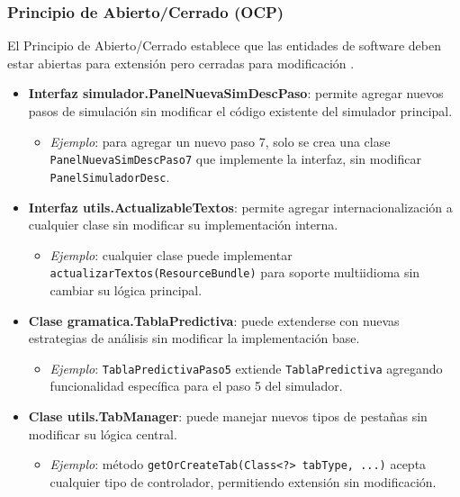 \subsubsection{Principio de Abierto/Cerrado (OCP)}

El Principio de Abierto/Cerrado establece que las entidades de software deben estar abiertas para extensión pero cerradas para modificación \cite{meyer1988object, martin2003agile}.

\begin{itemize}
    \item \textbf{Interfaz simulador.PanelNuevaSimDescPaso}: permite agregar nuevos pasos de simulación sin modificar el código existente del simulador principal.
    \begin{itemize}
        \item \textit{Ejemplo}: para agregar un nuevo paso 7, solo se crea una clase \texttt{PanelNuevaSimDescPaso7} que implemente la interfaz, sin modificar \texttt{PanelSimuladorDesc}.
    \end{itemize}

    \item \textbf{Interfaz utils.ActualizableTextos}: permite agregar internacionalización a cualquier clase sin modificar su implementación interna.
    \begin{itemize}
        \item \textit{Ejemplo}: cualquier clase puede implementar \texttt{actualizarTextos(ResourceBundle)} para soporte multiidioma sin cambiar su lógica principal.
    \end{itemize}

    \item \textbf{Clase gramatica.TablaPredictiva}: puede extenderse con nuevas estrategias de análisis sin modificar la implementación base.
    \begin{itemize}
        \item \textit{Ejemplo}: \texttt{TablaPredictivaPaso5} extiende \texttt{TablaPredictiva} agregando funcionalidad específica para el paso 5 del simulador.
    \end{itemize}

    \item \textbf{Clase utils.TabManager}: puede manejar nuevos tipos de pestañas sin modificar su lógica central.
    \begin{itemize}
        \item \textit{Ejemplo}: método \texttt{getOrCreateTab(Class<?> tabType, ...)} acepta cualquier tipo de controlador, permitiendo extensión sin modificación.
    \end{itemize}
\end{itemize}

